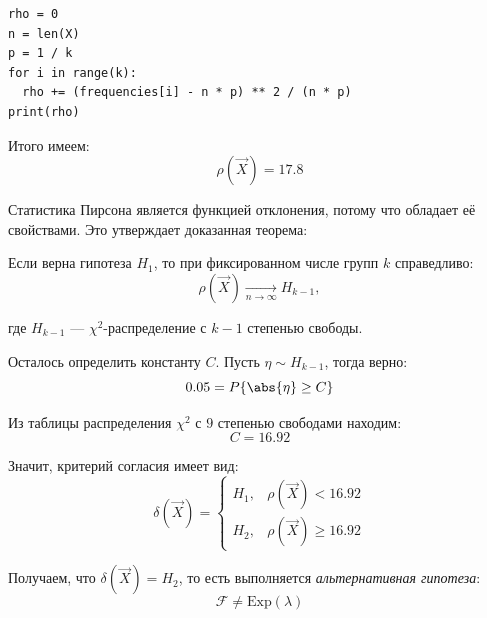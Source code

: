 \begin{lstlisting}[caption=Расчёт статистики Пирсона]
rho = 0
n = len(X)
p = 1 / k
for i in range(k):
  rho += (frequencies[i] - n * p) ** 2 / (n * p)
print(rho)
\end{lstlisting}

Итого имеем:
\[
    \rho(\vec{X})=17.8
\]

Статистика Пирсона является функцией отклонения, потому что обладает её свойствами. Это утверждает доказанная теорема:

\begin{theorem}[Пирсона]
Если верна гипотеза \( H_1 \), то при фиксированном числе групп \( k \) справедливо:
\[
    \rho(\vec{X})\xrightarrow[n\to\infty]{}H_{k-1},
\]

где \( H_{k-1} \) --- \( \chi^2 \)-распределение с \( k-1 \) степенью свободы.
\end{theorem}

Осталось определить константу \( C \). Пусть \( \eta\sim H_{k-1} \), тогда верно:
\[
    0.05=P\{\abs{\eta}\geq C\}
\]

Из таблицы распределения \( \chi^2 \) с \( 9 \) степенью свободами находим:
\[
    C=16.92
\]

Значит, критерий согласия имеет вид:
\[
    \delta(\vec{X})=
    \begin{cases}
        H_1, &\rho(\vec{X})<16.92\\
        H_2, &\rho(\vec{X})\geq 16.92
    \end{cases}
\]

Получаем, что \( \delta(\vec{X})=H_2 \), то есть выполняется \textit{альтернативная гипотеза}:
\[
    \mathcal{F}\neq\mathrm{Exp}(\lambda)
\]